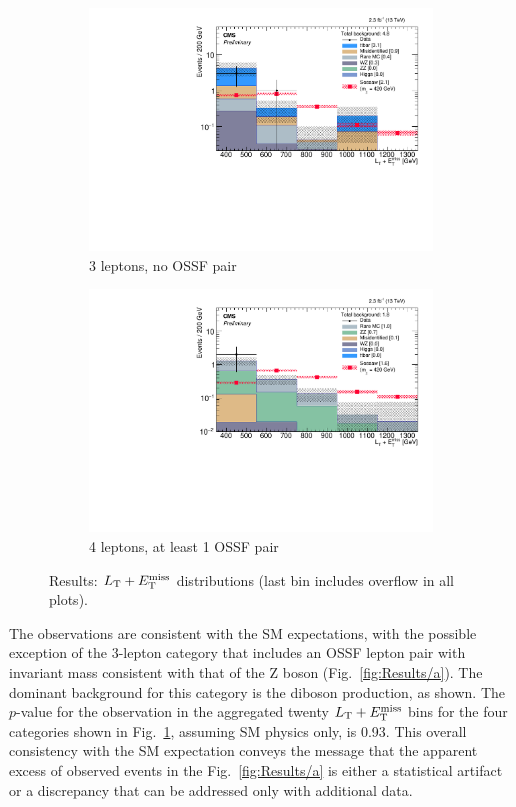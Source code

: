 \begin{figure}
\begin{center}
\begin{subfigure}[b]{.5\textwidth}
		\includegraphics[width=\textwidth]{Results/plots/L3DY0}
		\caption{3 leptons, no OSSF pair}
	\end{subfigure}%
	\begin{subfigure}[b]{.5\textwidth}
		\includegraphics[width=\textwidth]{Results/plots/L4DYgt0}
		\caption{4 leptons, at least 1 OSSF pair}
	\end{subfigure}%
	\caption{Results: $L_\textrm{T} + E_{\mathrm{T}}^{\text{miss}}$ distributions (last bin includes overflow in all plots).
	\label{fig:Results}}
\end{center}
\end{figure}

The observations are consistent with the SM expectations, with the possible exception of the 3-lepton category that includes an OSSF lepton pair with invariant mass consistent with that of the Z boson (Fig.~\ref{fig:Results/a}). The dominant background for this category is the \WZ diboson production, as shown. The $p$-value for the observation in the aggregated twenty $L_\textrm{T} + E_{\mathrm{T}}^{\text{miss}}$ bins for the four categories shown in Fig.~\ref{fig:Results}, assuming SM physics only, is 0.93. This overall consistency with the SM expectation conveys the message that the apparent excess of observed events in the Fig.~\ref{fig:Results/a} is either a statistical artifact or a discrepancy that can be addressed only with additional data.

